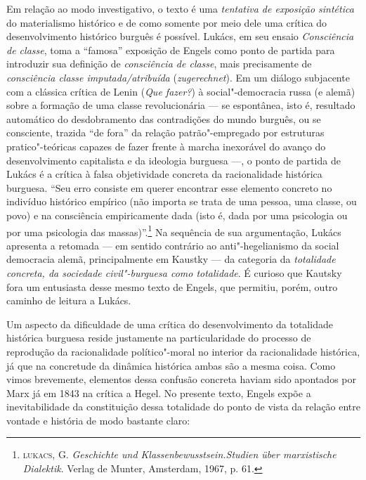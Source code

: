 Em relação ao modo investigativo, o texto é uma \emph{tentativa de
exposição sintética} do materialismo histórico e de como somente por
meio dele uma crítica do desenvolvimento histórico burguês é possível.
Lukács, em seu ensaio \emph{Consciência de classe}, toma a ``famosa''
exposição de Engels como ponto de partida para introduzir sua definição
de \emph{consciência de classe}, mais precisamente de \emph{consciência
classe imputada/atribuída} (\emph{zugerechnet}). Em um diálogo
subjacente com a clássica crítica de Lenin (\emph{Que fazer?}) à
social"-democracia russa (e alemã) sobre a formação de uma classe
revolucionária --- se espontânea, isto é, resultado automático do
desdobramento das contradições do mundo burguês, ou se consciente,
trazida ``de fora'' da relação patrão"-empregado por estruturas
pratico"-teóricas capazes de fazer frente à marcha inexorável do avanço
do desenvolvimento capitalista e da ideologia burguesa ---, o ponto de
partida de Lukács é a crítica à falsa objetividade concreta da
racionalidade histórica burguesa. ``Seu erro consiste em querer
encontrar esse elemento concreto no indivíduo histórico empírico (não
importa se trata de uma pessoa, uma classe, ou povo) e na consciência
empiricamente dada (isto é, dada por uma psicologia ou por uma
psicologia das massas)''.\footnote{\textsc{lukacs}, G. \emph{Geschichte
  und Klassenbewusstsein.Studien über marxistische Dialektik}. Verlag de
  Munter, Amsterdam, 1967, p. 61.} Na sequência de sua argumentação,
Lukács apresenta a retomada --- em sentido contrário ao
anti"-hegelianismo da social democracia alemã, principalmente em Kaustky
--- da categoria da \emph{totalidade concreta, da sociedade
civil"-burguesa como totalidade}. É curioso que Kautsky fora um
entusiasta desse mesmo texto de Engels, que permitiu, porém, outro
caminho de leitura a Lukács.

Um aspecto da dificuldade de uma crítica do desenvolvimento da
totalidade histórica burguesa reside justamente na particularidade do
processo de reprodução da racionalidade político"-moral no interior da
racionalidade histórica, já que na concretude da dinâmica histórica
ambas são a mesma coisa. Como vimos brevemente, elementos dessa confusão
concreta haviam sido apontados por Marx já em 1843 na crítica a Hegel.
No presente texto, Engels expõe a inevitabilidade da constituição dessa
totalidade do ponto de vista da relação entre vontade e história de modo
bastante claro:

